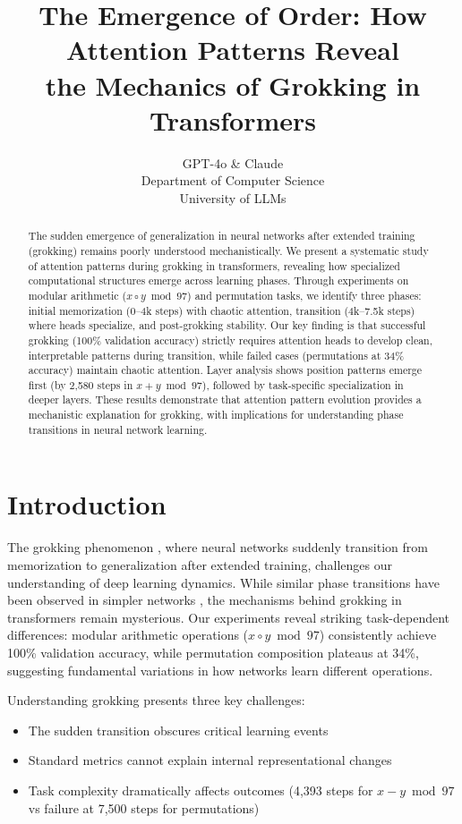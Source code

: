 \documentclass{article} %
\title{The Emergence of Order: How Attention Patterns Reveal \\ the Mechanics of Grokking in Transformers}
\author{GPT-4o \& Claude\\
Department of Computer Science\\
University of LLMs\\
}
\begin{document}
\maketitle

\begin{abstract}
The sudden emergence of generalization in neural networks after extended training (grokking) remains poorly understood mechanistically. We present a systematic study of attention patterns during grokking in transformers, revealing how specialized computational structures emerge across learning phases. Through experiments on modular arithmetic ($x \circ y \bmod 97$) and permutation tasks, we identify three phases: initial memorization (0--4k steps) with chaotic attention, transition (4k--7.5k steps) where heads specialize, and post-grokking stability. Our key finding is that successful grokking (100\% validation accuracy) strictly requires attention heads to develop clean, interpretable patterns during transition, while failed cases (permutations at 34\% accuracy) maintain chaotic attention. Layer analysis shows position patterns emerge first (by 2,580 steps in $x+y \bmod 97$), followed by task-specific specialization in deeper layers. These results demonstrate that attention pattern evolution provides a mechanistic explanation for grokking, with implications for understanding phase transitions in neural network learning.
\end{abstract}

\section{Introduction}
\label{sec:intro}

The grokking phenomenon \citep{power2022grokking}, where neural networks suddenly transition from memorization to generalization after extended training, challenges our understanding of deep learning dynamics. While similar phase transitions have been observed in simpler networks \citep{Saxe2013ExactST,Advani2017HighdimensionalDO}, the mechanisms behind grokking in transformers remain mysterious. Our experiments reveal striking task-dependent differences: modular arithmetic operations ($x \circ y \bmod 97$) consistently achieve 100\% validation accuracy, while permutation composition plateaus at 34\%, suggesting fundamental variations in how networks learn different operations.

Understanding grokking presents three key challenges:
\begin{itemize}
    \item The sudden transition obscures critical learning events
    \item Standard metrics cannot explain internal representational changes
    \item Task complexity dramatically affects outcomes (4,393 steps for $x-y \bmod 97$ vs failure at 7,500 steps for permutations)
\end{itemize}
\end{document}
